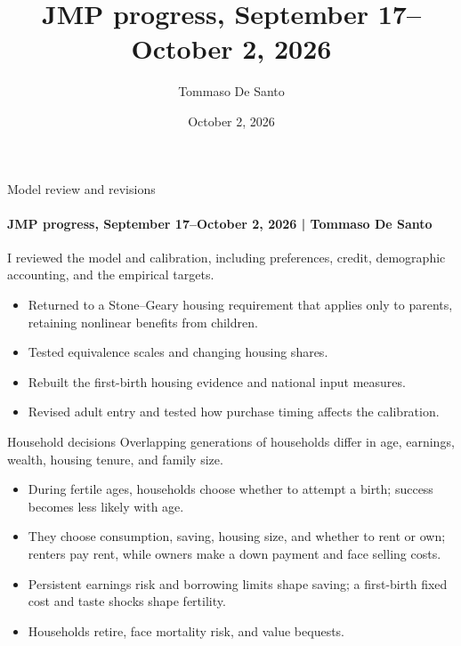 \documentclass[11pt,aspectratio=169]{beamer}
\title{JMP progress, September 17--October 2, 2026}
\author{Tommaso De Santo}
\date{October 2, 2026}
\begin{document}
\begin{frame}{Model review and revisions}
\framesubtitle{JMP progress, September 17--October 2, 2026 \qquad | \qquad Tommaso De Santo}
\small
I reviewed the model and calibration, including preferences, credit, demographic accounting, and the empirical targets.
\medskip
\begin{itemize}\setlength\itemsep{7pt}
 \item Returned to a Stone--Geary housing requirement that applies only to parents, retaining nonlinear benefits from children.
 \item Tested equivalence scales and changing housing shares.
 \item Rebuilt the first-birth housing evidence and national input measures.
 \item Revised adult entry and tested how purchase timing affects the calibration.
\end{itemize}
\end{frame}

\begin{frame}{Household decisions}
\small
Overlapping generations of households differ in age, earnings, wealth, housing tenure, and family size.
\medskip
\begin{itemize}\setlength\itemsep{7pt}
 \item During fertile ages, households choose whether to attempt a birth; success becomes less likely with age.
 \item They choose consumption, saving, housing size, and whether to rent or own; renters pay rent, while owners make a down payment and face selling costs.
 \item Persistent earnings risk and borrowing limits shape saving; a first-birth fixed cost and taste shocks shape fertility.
 \item Households retire, face mortality risk, and value bequests.
\end{itemize}

\end{frame}
\end{document}
